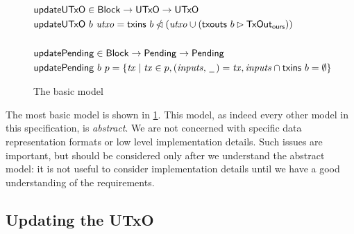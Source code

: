 \documentclass{article}
\newcommand{\restrictdom}{\lhd}
\newcommand{\subtractdom}{\mathbin{\slashed{\restrictdom}}}
\newcommand{\restrictrange}{\rhd}
\theoremstyle{definition}{
  \newtheorem{lemma}{Lemma}[section] %
  \newtheorem{definition}[lemma]{Definition}
}
\theoremstyle{theorem}{
  \newtheorem{invariant}[lemma]{Invariant}
  \newtheorem{proofobligation}[lemma]{Proof Obligation}
}
\numberwithin{equation}{lemma}
\begin{document}
\begin{figure}
\begin{align*}
\\
& \mathsf{updateUTxO} \in \mathsf{Block} \to \mathsf{UTxO} \to \mathsf{UTxO} \\
& \mathsf{updateUTxO} ~ b ~ \mathit{utxo} = \mathsf{txins} ~ b \subtractdom (\mathit{utxo} \cup (\mathsf{txouts} ~ b \restrictrange \mathsf{TxOut_{ours}})) \\
\\
& \mathsf{updatePending} \in \mathsf{Block} \to \mathsf{Pending} \to \mathsf{Pending} \\
& \mathsf{updatePending} ~ b ~ p = \{ \mathit{tx} \mid \mathit{tx} \in p, (\mathit{inputs}, \,\underline{\phantom{a}}\,) = \mathit{tx}, \mathit{inputs} \cap \mathsf{txins} ~ b = \emptyset \}
\end{align*}
%
\caption{\label{fig:basic_model}The basic model}
\end{figure}

The most basic model is shown in \cref{fig:basic_model}. This model, as
indeed every other model in this specification, is \emph{abstract}. We are not
concerned with specific data representation formats or low level implementation
details. Such issues are important, but should be considered only after we
understand the abstract model: it is not useful to consider implementation
details until we have a good understanding of the requirements.

\subsection{Updating the UTxO}
\label{sec:UpdatingUtxo}
\end{document}
